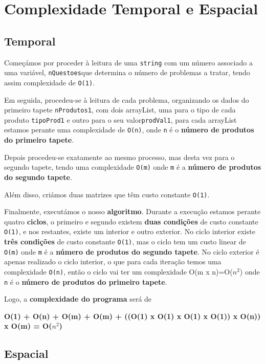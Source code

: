 \documentclass[11pt]{article}
\begin{document}
\section{Complexidade Temporal e Espacial}

\subsection{Temporal}

\hspace{0,5cm}Começámos por proceder à leitura de uma \verb|string| com um número associado a uma variável, \verb|nQuestoes|que determina o número de problemas a tratar, tendo assim complexidade de \verb|O(1)|.

Em seguida, procedeu-se à leitura de cada problema, organizando os dados do primeiro tapete \verb|nProdutos1|, com dois arrayList, uma para o tipo de cada produto \verb|tipoProd1| e outro para o seu valor\verb|prodVal1|, para cada arrayList estamos perante uma complexidade de \verb|O(n)|, onde \verb|n| é o \textbf{número de produtos do primeiro tapete}.

Depois procedeu-se exatamente ao mesmo processo, mas desta vez para o segundo tapete, tendo uma complexidade
\verb|O(m)| onde \verb|m| é a \textbf{número de produtos do segundo tapete}.


Além disso, criámos duas matrizes que têm custo constante \verb|O(1)|.

Finalmente, executámos o nosso \textbf{algoritmo}. Durante a execução estamos perante quatro \textbf{ciclos}, o primeiro e segundo existem \textbf{duas condições} de custo constante \verb|O(1)|, e nos restantes,
existe um interior e outro exterior. No ciclo interior existe \textbf{três condições} de custo constante \verb|O(1)|,
mas o ciclo tem um custo linear de \verb|O(m)| onde \verb|m| é a \textbf{número de produtos do segundo tapete}.
No ciclo exterior é apenas realizado o ciclo interior, o que para cada iteração temos uma complexidade
\verb|O(n)|, então o ciclo vai ter um complexidade O(m x n)=O($n^{2}$) onde \verb|n| é o \textbf{número de produtos do primeiro tapete}.

Logo, a \textbf{complexidade do programa} será de

\begin{center}
    \textbf{O(1) + O(n) + O(m) + O(m) + ((O(1) x O(1) x O(1) x O(1)) x O(n)) x O(m) = O($n^{2}$)}
\end{center}

\subsection{Espacial}
\end{document}
